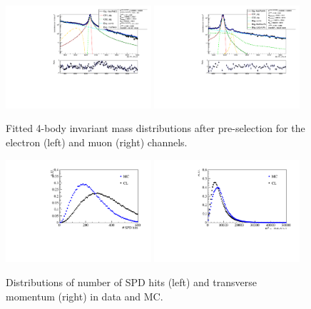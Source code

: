  \begin{figure}[h!]
\centering
\includegraphics[width=0.48\textwidth]{RKst/figs/sW/KstJPsEE_log_fitAndRes.pdf}
\includegraphics[width=0.48\textwidth]{RKst/figs/sW/KstJPsMM_log_fitAndRes.pdf}
\caption{Fitted 4-body invariant mass distributions after pre-selection 
for the electron (left) and muon (right) channels.}
\label{fig:RKst_sW_mass}
\end{figure}

 \begin{figure}[h!]
\centering
\includegraphics[width=0.48\textwidth]{RKst/figs/nspd_12.pdf}
\includegraphics[width=0.48\textwidth]{RKst/figs/bpt.pdf}
\caption{Distributions of number of SPD hits (left) and \Bz transverse momentum (right) in data and MC.}
\label{fig:b0pt_nSPD_distrib}
\end{figure}


